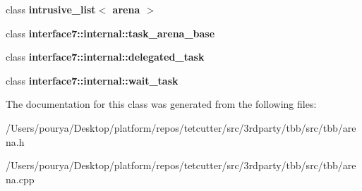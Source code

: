 \begin{DoxyCompactItemize}
\item 
\hypertarget{classtbb_1_1internal_1_1arena_ac02643528d394119b70dcb718718feb6}{}class {\bfseries intrusive\+\_\+list$<$ arena $>$}\label{classtbb_1_1internal_1_1arena_ac02643528d394119b70dcb718718feb6}

\item 
\hypertarget{classtbb_1_1internal_1_1arena_a33ee01083d37cbf6423ed0cd32f32505}{}class {\bfseries interface7\+::internal\+::task\+\_\+arena\+\_\+base}\label{classtbb_1_1internal_1_1arena_a33ee01083d37cbf6423ed0cd32f32505}

\item 
\hypertarget{classtbb_1_1internal_1_1arena_ac2eea6dcb5c60b3106225e329e11a875}{}class {\bfseries interface7\+::internal\+::delegated\+\_\+task}\label{classtbb_1_1internal_1_1arena_ac2eea6dcb5c60b3106225e329e11a875}

\item 
\hypertarget{classtbb_1_1internal_1_1arena_a0ed3b2d4592ab7133fad5142f0941193}{}class {\bfseries interface7\+::internal\+::wait\+\_\+task}\label{classtbb_1_1internal_1_1arena_a0ed3b2d4592ab7133fad5142f0941193}

\end{DoxyCompactItemize}


The documentation for this class was generated from the following files\+:\begin{DoxyCompactItemize}
\item 
/\+Users/pourya/\+Desktop/platform/repos/tetcutter/src/3rdparty/tbb/src/tbb/arena.\+h\item 
/\+Users/pourya/\+Desktop/platform/repos/tetcutter/src/3rdparty/tbb/src/tbb/arena.\+cpp\end{DoxyCompactItemize}
